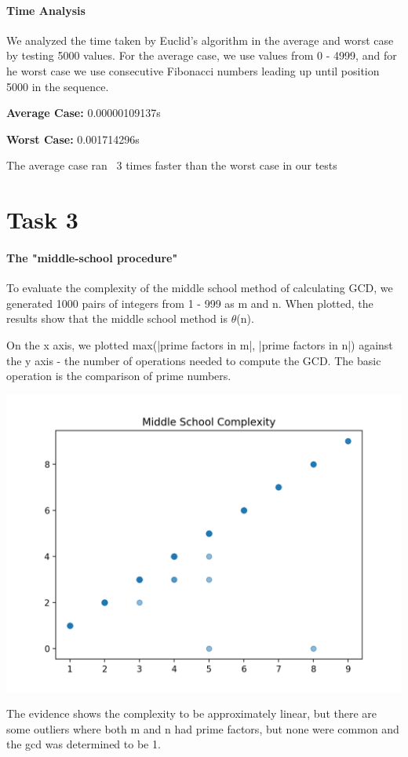 \documentclass{report}
\begin{document}
\begin{flushleft}
		\paragraph{Time Analysis}

		We analyzed the time taken by Euclid's algorithm in the average and worst case by testing 5000 values. For the average case,
		we use values from 0 - 4999, and for he worst case we use consecutive Fibonacci numbers leading up until 
		position 5000 in the sequence.
		
		\textbf{Average Case:} 0.00000109137s

		\textbf{Worst Case: } 0.001714296s

		The average case ran ~3 times faster than the worst case in our tests

		\section{Task 3}

		\paragraph{The "middle-school procedure"}
		To evaluate the complexity of the middle school method of calculating GCD, we generated 1000 pairs of integers from 1 - 999 as m and n. When plotted, the results
		show that the middle school method is $\theta$(n).

		On the x axis, we plotted max(|prime factors in m|, |prime factors in n|) against the y axis - the number of operations needed
		to compute the GCD. The basic operation is the comparison of prime numbers.

		\includegraphics{task3}

		The evidence shows the complexity to be approximately linear, but there are some outliers where 
		both m and n had prime factors, but none were common and the gcd was determined to be 1.


	\end{flushleft}
\end{document}

